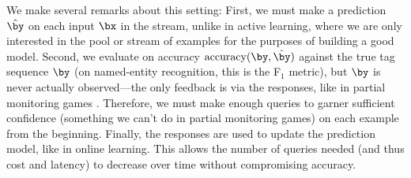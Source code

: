 We make several remarks about this setting:
First, we must make a prediction $\hat \by$ on each input $\bx$ in the stream,
unlike in active learning, where we are only interested in the pool or stream of examples
for the purposes of building a good model.
Second, we evaluate on accuracy $\accuracy(\by, \byt)$ against the true tag sequence $\by$
(on named-entity recognition, this is the F$_1$ metric),
but $\by$ is never actually observed---the only feedback is via the responses,
like in partial monitoring games \citep{cesabianchi06regret}.
Therefore, we must make enough queries to garner sufficient confidence
(something we can't do in partial monitoring games)
on each example from the beginning.
Finally, the responses are used to update the prediction model, like in online learning.
This allows the number of queries needed (and thus cost and latency) to decrease over time
without compromising accuracy.






